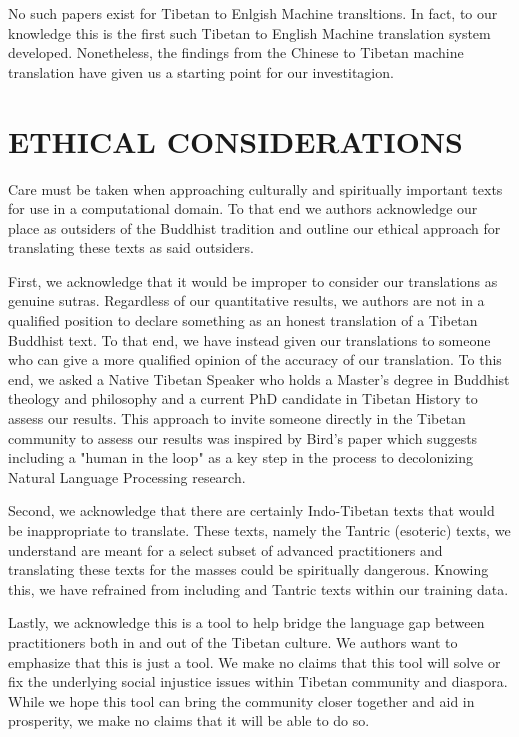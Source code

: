 \documentclass[letterpaper, 12 pt, conference]{ieeeconf}  %
\begin{document}
No such papers exist for Tibetan to Enlgish Machine transltions. In fact, to our knowledge this is the first such Tibetan to English Machine translation system developed.  Nonetheless, the findings from the Chinese to Tibetan machine translation have given us a starting point for our investitagion.  



\section{ETHICAL CONSIDERATIONS}

Care must be taken when approaching culturally and spiritually important texts for use in a computational domain. To that end we authors acknowledge our place as outsiders of the Buddhist tradition and outline our ethical approach for translating these texts as said outsiders.

First, we acknowledge that it would be improper to consider our translations as genuine sutras. Regardless of our quantitative results, we authors are not in a qualified position to declare something as an honest translation of a Tibetan Buddhist text. To that end, we have instead given our translations to someone who can give a more qualified opinion of the accuracy of our translation. To this end, we asked a Native Tibetan Speaker who holds a Master's degree in Buddhist theology and philosophy and a current PhD candidate in Tibetan History to  assess our results. This approach to invite someone directly in the Tibetan community to assess our results was inspired by Bird's paper \cite{c7} which suggests including a "human in the loop" as a key step in the process to decolonizing Natural Language Processing research. 

Second, we acknowledge that there are certainly Indo-Tibetan texts that would be inappropriate to translate. These texts, namely the Tantric (esoteric) texts, we understand are meant for a select subset of advanced practitioners and translating these texts for the masses could be spiritually dangerous. Knowing this, we have refrained from including and Tantric texts within our training data. 

Lastly, we acknowledge this is a tool to help bridge the language gap between practitioners both in and out of the Tibetan culture. We authors want to emphasize that this is just a tool. We make no claims that this tool will solve or fix the underlying social injustice issues within Tibetan community and diaspora. While we hope this tool can bring the community closer together and aid in prosperity, we make no claims that it will be able to do so. 
\end{document}
